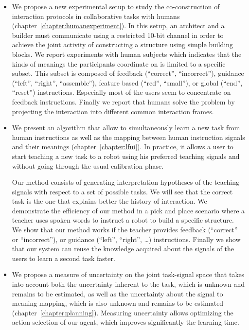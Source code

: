 \begin{itemize}

\item We propose a new experimental setup to study the co-construction of interaction protocols in collaborative tasks with humans \cite{vollmer2014studying} (chapter~\ref{chapter:humanexperiment}). In this setup, an architect and a builder must communicate using a restricted 10-bit channel in order to achieve the joint activity of constructing a structure using simple building blocks. We report experiments with human subjects which indicates that the kinds of meanings the participants coordinate on is limited to a specific subset. This subset is composed of feedback (``correct'', ``incorrect''), guidance (``left'', ``right'', ``assemble''), feature based (``red'', ``small''), or global (``end'', ``reset'') instructions. Especially most of the users seem to concentrate on feedback instructions. Finally we report that humans solve the problem by projecting the interaction into different common interaction frames.

\item  We present an algorithm that allow to simultaneously learn a new task from human instructions as well as the mapping between human instruction signals and their meanings \cite{grizou2013interactive,grizou2013robot,grizou2014robot,grizou2014calibration,grizou2014interactive} (chapter~\ref{chapter:lfui}). In practice, it allows a user to start teaching a new task to a robot using his preferred teaching signals and without going through the usual calibration phase.  

Our method consists of generating interpretation hypotheses of the teaching signals with respect to a set of possible tasks. We will see that the correct task is the one that explains better the history of interaction. We demonstrate the efficiency of our method in a pick and place scenario where a teacher uses spoken words to instruct a robot to build a specific structure. We show that our method works if the teacher provides feedback (``correct'' or ``incorrect''), or guidance (``left'', ``right'', \ldots) instructions. Finally we show that our system can reuse the knowledge acquired about the signals of the users to learn a second task faster.

\item We propose a measure of uncertainty on the joint task-signal space that takes into account both the uncertainty inherent to the task, which is unknown and remains to be estimated, as well as the uncertainty about the signal to meaning mapping, which is also unknown and remains to be estimated \cite{grizou2014calibration,grizou2014interactive} (chapter~\ref{chapter:planning}). Measuring uncertainty allows optimizing the action selection of our agent, which improves significantly the learning time.


\end{itemize}
